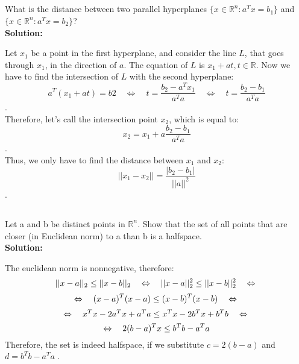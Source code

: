 \documentclass[10pt]{article}
\newcommand{\R}{\mathbb{R}}
\begin{document}
  	
  	\begin{center}
    	\section{}
  	\end{center}\par
  	What is the distance between two parallel hyperplanes $\{x \in \R^n : a^Tx = b_1 \}$ and
$\{x \in \R^n : a^Tx = b_2 \}$?\\
  	\textbf{Solution:}\par
  	Let $x_1$ be a point in the first hyperplane, and consider the line $L$, that goes through $x_1$, in the direction of $a$. The equation of $L$ is $x_1+at, t \in \R$. Now we have to find the intersection of $L$ with the second hyperplane: \\
  	$$a^T(x_1+at) = b2 \quad \Leftrightarrow \quad  t = \frac{b_2 - a^Tx_1}{a^Ta} \quad \Leftrightarrow \quad t = \frac{b_2 - b_1}{a^Ta}$$. \\
  	Therefore, let's call the intersection point $x_2$, which is equal to: \\
  	$$x_2 = x_1 + a\frac{b_2 - b_1}{a^Ta}$$. \\
  	Thus, we only have to find the distance between $x_1$ and $x_2$: \\
  	$$||x_1 - x_2|| = \frac{|b_2-b_1|}{||a||^2}$$.
  	\par
 
  	
  	
  	\newpage
  	
  	
  	\begin{center}
  	\section{}
  	\end{center}\par
  	Let a and b be distinct points in $\R^n$. Show that the set of all points that are closer (in
Euclidean norm) to a than b is a halfspace.\\
  	\textbf{Solution: }\par
  	The euclidean norm is nonnegative, therefore:  \\
  	$$||x-a||_2 \leq ||x-b||_2 \quad \Leftrightarrow \quad ||x-a||_2^2 \leq ||x-b||_2^2 \quad \Leftrightarrow \\$$
  	$$\Leftrightarrow \quad (x-a)^T(x-a) \leq (x-b)^T(x-b) \quad  \Leftrightarrow \\$$
 $$ 	\Leftrightarrow \quad x^Tx - 2a^Tx + a^Ta \leq x^Tx - 2b^Tx + b^Tb \quad \Leftrightarrow \\$$
  $$	\Leftrightarrow \quad 2(b-a)^Tx \leq b^Tb - a^Ta \\ $$
  	Therefore, the set is indeed halfspace, if we substitute $ c = 2(b-a)$ and $ d = b^Tb - a^Ta$ .
  	\newpage
  	
\end{document}
